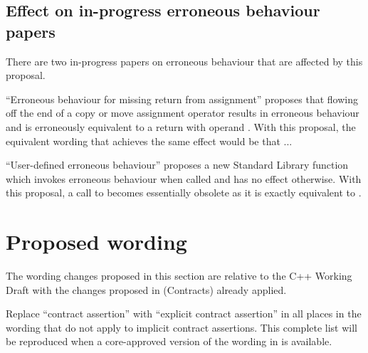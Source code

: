 \subsection{Effect on in-progress erroneous behaviour papers}

There are two in-progress papers on erroneous behaviour that are affected by this proposal.

\cite{P2973R0} ``Erroneous behaviour for missing return from assignment'' proposes that flowing off the end of a copy or move assignment operator results in erroneous behaviour and is erroneously equivalent to a return with operand . With this proposal, the equivalent wording that achieves the same effect would be that ... %

\cite{P3232R1} ``User-defined erroneous behaviour'' proposes a new Standard Library function  which invokes erroneous behaviour when called and has no effect otherwise. With this proposal, a call to  becomes essentially obsolete as it is exactly equivalent to \mbox{}. 



\section{Proposed wording}

The wording changes proposed in this section are relative to the C++ Working Draft \cite{N5001} with the changes proposed in \cite{P2900R13} (Contracts) already applied. 


Replace ``contract assertion'' with ``explicit contract assertion'' in all places in the wording that do not apply to implicit contract assertions.  This complete list will be reproduced when a core-approved version of the wording in \cite{P2900R13} is available.

